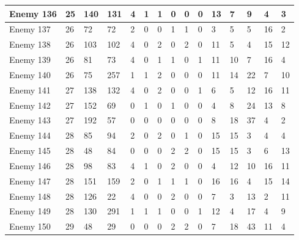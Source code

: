 \begin{sidewaystable}[!h]
{\begin{tabular}{|l|l|l|l|l|l|l|l|l|l|l|l|l|l|l|}
			Enemy 136 & 25 & 140 & 131 & 4 & 1 & 1 & 0 & 0 & 0 & 13 & 7 & 9 & 4 & 3 \\ \hline
			Enemy 137 & 26 & 72 & 72 & 2 & 0 & 0 & 1 & 1 & 0 & 3 & 5 & 5 & 16 & 2 \\ \hline
			Enemy 138 & 26 & 103 & 102 & 4 & 0 & 2 & 0 & 2 & 0 & 11 & 5 & 4 & 15 & 12 \\ \hline
			Enemy 139 & 26 & 81 & 73 & 4 & 0 & 1 & 1 & 0 & 1 & 11 & 10 & 7 & 16 & 4 \\ \hline
			Enemy 140 & 26 & 75 & 257 & 1 & 1 & 2 & 0 & 0 & 0 & 11 & 14 & 22 & 7 & 10 \\ \hline
			Enemy 141 & 27 & 138 & 132 & 4 & 0 & 2 & 0 & 0 & 1 & 6 & 5 & 12 & 16 & 11 \\ \hline
			Enemy 142 & 27 & 152 & 69 & 0 & 1 & 0 & 1 & 0 & 0 & 4 & 8 & 24 & 13 & 8 \\ \hline
			Enemy 143 & 27 & 192 & 57 & 0 & 0 & 0 & 0 & 0 & 0 & 8 & 18 & 37 & 4 & 2 \\ \hline
			Enemy 144 & 28 & 85 & 94 & 2 & 0 & 2 & 0 & 1 & 0 & 15 & 15 & 3 & 4 & 4 \\ \hline
			Enemy 145 & 28 & 48 & 84 & 0 & 0 & 0 & 2 & 2 & 0 & 15 & 15 & 3 & 6 & 13 \\ \hline
			Enemy 146 & 28 & 98 & 83 & 4 & 1 & 0 & 2 & 0 & 0 & 4 & 12 & 10 & 16 & 11 \\ \hline
			Enemy 147 & 28 & 151 & 159 & 2 & 0 & 1 & 1 & 1 & 0 & 16 & 16 & 4 & 15 & 14 \\ \hline
			Enemy 148 & 28 & 126 & 22 & 4 & 0 & 0 & 2 & 0 & 0 & 7 & 3 & 13 & 2 & 11 \\ \hline
			Enemy 149 & 28 & 130 & 291 & 1 & 1 & 1 & 0 & 0 & 1 & 12 & 4 & 17 & 4 & 9 \\ \hline
			Enemy 150 & 29 & 48 & 29 & 0 & 0 & 0 & 2 & 2 & 0 & 7 & 18 & 43 & 11 & 4 \\ \hline
		\end{tabular}%
	}
\end{sidewaystable}
\clearpage



